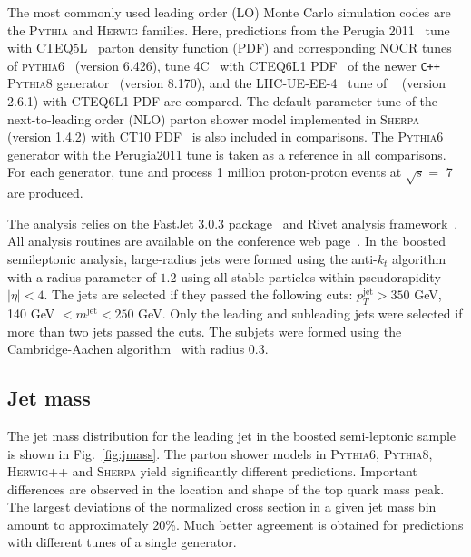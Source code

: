 The most commonly used leading order (LO) Monte Carlo simulation codes are
the \textsc{Pythia} and \textsc{Herwig} families. 
Here, predictions from the Perugia 2011~\cite{Skands:2009zm} tune with
CTEQ5L~\cite{Lai:1999wy} parton density function (PDF) and corresponding 
NOCR tunes of \textsc{pythia6}~\cite{Sjostrand:2000wi,Sjostrand:2006za}
(version 6.426), tune 4C~\cite{Corke:2010yf} with CTEQ6L1 PDF~\cite{cteq6} 
of the newer \texttt{C++} \textsc{Pythia8} generator~\cite{Sjostrand:2007gs}
(version 8.170), and the LHC-UE-EE-4~\cite{Gieseke:2012ft} tune of
\hpp~\cite{Bahr:2008pv,Gieseke:2011na} (version 2.6.1) with CTEQ6L1 
PDF are compared. The default parameter tune of the
next-to-leading order (NLO) parton shower model implemented in
\textsc{Sherpa}~\cite{Gleisberg:2008ta} (version 1.4.2) with CT10 
PDF~\cite{Lai:2010vv} is also included in comparisons. 
The \textsc{Pythia6} generator with the Perugia2011 tune is taken as a 
reference in all comparisons. 
For each generator, tune and process 1 million proton-proton events at $\sqrt{s}=$ 7~\tev{} are produced.




The analysis relies on the FastJet 3.0.3 package~\cite{Cacciari:2011ma,Cacciari:2008gn} 
and Rivet analysis framework~\cite{Buckley:2010ar}. All 
analysis routines are available on the conference web page~\cite{rivetroutines}.
In the boosted semileptonic \ttbar analysis, 
large-radius jets were formed using the anti-$k_t$ 
algorithm~\cite{Cacciari:2008gp} with a radius parameter of $1.2$
using all stable particles within pseudorapidity $|\eta| < 4$.
The jets are selected if they passed 
the following cuts: $p_T^{\text{jet}} > 350$ GeV, 140 GeV
$ < m^{\text{jet}} < 250$ GeV. 
Only the leading and subleading jets were selected if more than two 
jets passed the cuts.
The subjets were formed using the Cambridge-Aachen 
algorithm~\cite{Dokshitzer:1997in,Wobisch:1998wt} with radius $0.3$.




\subsection{Jet mass}


The jet mass distribution for the leading jet in the boosted semi-leptonic
\ttbar{} sample is shown in Fig.~\ref{fig:jmass}. The  
parton shower models in \textsc{Pythia6}, \textsc{Pythia8}, \textsc{Herwig++} 
and \textsc{Sherpa} yield significantly different predictions. 
Important differences
are observed in the location and shape of the top quark mass peak.
The largest deviations of the normalized cross section 
in a given jet mass bin amount to approximately 20\%. 
Much better agreement is obtained for predictions with different tunes of a 
single generator.


